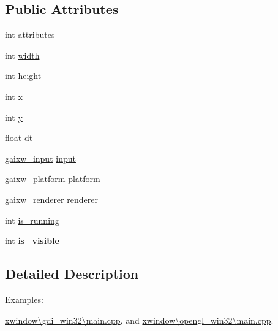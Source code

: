 \subsection*{Public Attributes}
\begin{DoxyCompactItemize}
\item 
int \hyperlink{structgaixw__context_ab0f6565b924d7496d7445915f01294e2}{attributes}
\item 
int \hyperlink{structgaixw__context_a303c87d56adc742cf236b1ab00a7034b}{width}
\item 
int \hyperlink{structgaixw__context_a42531a46c276892a37d32595f819dd8e}{height}
\item 
int \hyperlink{structgaixw__context_a562a7feb15e0c9e1aba48489b68529dc}{x}
\item 
int \hyperlink{structgaixw__context_a8ae55e0362fe3112990d78e12a9e22c3}{y}
\item 
float \hyperlink{structgaixw__context_a7b04c4d4c59ab6354686a79221673ad8}{dt}
\item 
\hyperlink{structgaixw__input}{gaixw\+\_\+input} \hyperlink{structgaixw__context_a4a9d2e14ebb24977fb5df84d361c851f}{input}
\item 
\hyperlink{uniongaixw__platform}{gaixw\+\_\+platform} \hyperlink{structgaixw__context_aa297ac21e147f4cde74e021b62b3e673}{platform}
\item 
\hyperlink{structgaixw__renderer}{gaixw\+\_\+renderer} \hyperlink{structgaixw__context_a5984d461e227d9028db4d9327bc9c2c4}{renderer}
\item 
int \hyperlink{structgaixw__context_a7165f8e7f0c548dd3a11c8648fb8071a}{is\+\_\+running}
\item 
\mbox{\label{structgaixw__context_acb9eb436a1a802598abfbf6934c4d8d2}} 
int {\bfseries is\+\_\+visible}
\end{DoxyCompactItemize}


\subsection{Detailed Description}
\begin{Desc}
\item[Examples\+: ]\par
\hyperlink{xwindow_0Cgdi_win32_0Cmain_8cpp-example}{xwindow\textbackslash{}gdi\+\_\+win32\textbackslash{}main.\+cpp}, and \hyperlink{xwindow_0Copengl_win32_0Cmain_8cpp-example}{xwindow\textbackslash{}opengl\+\_\+win32\textbackslash{}main.\+cpp}.\end{Desc}



